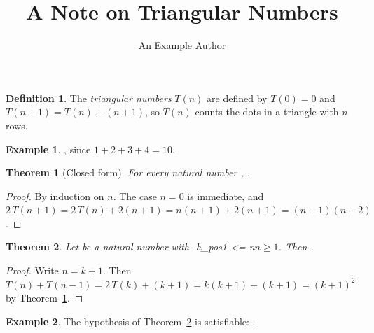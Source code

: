\documentclass[11pt]{article}
\title{A Note on Triangular Numbers}
\author{An Example Author}
\date{}
\newtheorem{theorem}{Theorem}
\theoremstyle{definition}
\newtheorem{definition}{Definition}
\newtheorem{example}{Example}
\begin{document}
\maketitle

\begin{definition}
The \emph{triangular numbers} $T(n)$ are defined by $T(0) = 0$ and
$T(n+1) = T(n) + (n+1)$, so $T(n)$ counts the dots in a triangle with $n$ rows.
\end{definition}

\begin{example}
, since $1 + 2 + 3 + 4 = 10$.
\end{example}

\begin{theorem}[Closed form]\label{thm:closed}
For every natural number ,
.
\end{theorem}

\begin{proof}
By induction on $n$. The case $n = 0$ is immediate, and
$2\,T(n+1) = 2\,T(n) + 2(n+1) = n(n+1) + 2(n+1) = (n+1)(n+2)$.
\end{proof}

\begin{theorem}\label{thm:square}
Let  be a natural number with \hyp{h_pos}{1 <= n}{$n \geq 1$}.
Then .
\end{theorem}

\begin{proof}
Write $n = k + 1$. Then $T(n) + T(n-1) = 2\,T(k) + (k+1) = k(k+1) + (k+1) = (k+1)^2$
by Theorem~\ref{thm:closed}.
\end{proof}

\begin{example}
The hypothesis of Theorem~\ref{thm:square} is satisfiable:
.
\end{example}
\end{document}
